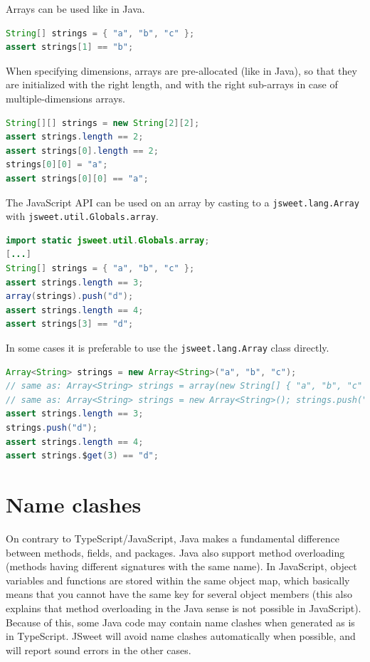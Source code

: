 \documentclass[a4paper]{report}
\begin{document}
Arrays can be used like in Java. 

\begin{lstlisting}[language=Java]
String[] strings = { "a", "b", "c" };
assert strings[1] == "b";
\end{lstlisting}

When specifying dimensions, arrays are pre-allocated (like in Java), so that they are initialized with the right length, and with the right sub-arrays in case of multiple-dimensions arrays.

\begin{lstlisting}[language=Java]
String[][] strings = new String[2][2];
assert strings.length == 2;
assert strings[0].length == 2;
strings[0][0] = "a";
assert strings[0][0] == "a";
\end{lstlisting}

The JavaScript API can be used on an array by casting to a \texttt{jsweet.\-lang.\-Array} with \texttt{jsweet.\-util.\-Globals.\-array}.

\begin{lstlisting}[language=Java]
import static jsweet.util.Globals.array;
[...]
String[] strings = { "a", "b", "c" };
assert strings.length == 3;
array(strings).push("d");
assert strings.length == 4;
assert strings[3] == "d";
\end{lstlisting}

In some cases it is preferable to use the \texttt{jsweet.\-lang.\-Array} class directly.

\begin{lstlisting}[language=Java]
Array<String> strings = new Array<String>("a", "b", "c");
// same as: Array<String> strings = array(new String[] { "a", "b", "c" });
// same as: Array<String> strings = new Array<String>(); strings.push("a", "b", "c");
assert strings.length == 3;
strings.push("d");
assert strings.length == 4;
assert strings.$get(3) == "d";
\end{lstlisting}

\section{Name clashes}

On contrary to TypeScript/JavaScript, Java makes a fundamental difference between methods, fields, and packages. Java also support method overloading (methods having different signatures with the same name). In JavaScript, object variables and functions are stored within the same object map, which basically means that you cannot have the same key for several object members (this also explains that method overloading in the Java sense is not possible in JavaScript). Because of this, some Java code may contain name clashes when generated as is in TypeScript. JSweet will avoid name clashes automatically when possible, and will report sound errors in the other cases.
\end{document}
